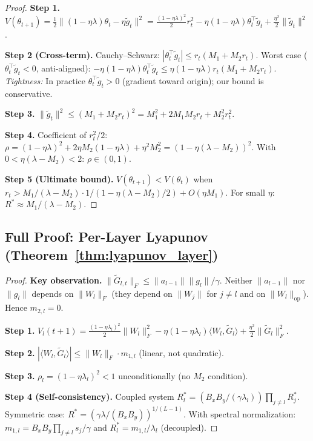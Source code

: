\documentclass{article}
\providecommand{\norm}[1]{\lVert #1 \rVert}
\theoremstyle{plain}
\theoremstyle{definition}
\theoremstyle{remark}
\begin{document}
\begin{proof}
\textbf{Step 1.} $V(\theta_{t+1})=\frac{1}{2}\norm{(1-\eta\lambda)\theta_t-\eta\tilde{g}_t}^2 = \frac{(1-\eta\lambda)^2}{2}r_t^2 - \eta(1-\eta\lambda)\theta_t^\top\tilde{g}_t + \frac{\eta^2}{2}\norm{\tilde{g}_t}^2$.

\textbf{Step 2 (Cross-term).} Cauchy--Schwarz: $|\theta_t^\top\tilde{g}_t|\leq r_t(M_1+M_2 r_t)$. Worst case ($\theta_t^\top\tilde{g}_t<0$, anti-aligned): $-\eta(1-\eta\lambda)\theta_t^\top\tilde{g}_t \leq \eta(1-\eta\lambda)r_t(M_1+M_2 r_t)$. \emph{Tightness:} In practice $\theta_t^\top\tilde{g}_t>0$ (gradient toward origin); our bound is conservative.

\textbf{Step 3.} $\norm{\tilde{g}_t}^2 \leq (M_1+M_2 r_t)^2 = M_1^2 + 2M_1 M_2 r_t + M_2^2 r_t^2$.

\textbf{Step 4.} Coefficient of $r_t^2/2$: $\rho=(1-\eta\lambda)^2+2\eta M_2(1-\eta\lambda)+\eta^2 M_2^2=(1-\eta(\lambda-M_2))^2$. With $0<\eta(\lambda-M_2)<2$: $\rho\in(0,1)$.

\textbf{Step 5 (Ultimate bound).} $V(\theta_{t+1})<V(\theta_t)$ when $r_t > M_1/(\lambda-M_2)\cdot 1/(1-\eta(\lambda-M_2)/2)+O(\eta M_1)$. For small $\eta$: $R^*\approx M_1/(\lambda-M_2)$.
\end{proof}

\subsection{Full Proof: Per-Layer Lyapunov (Theorem~\ref{thm:lyapunov_layer})}

\begin{proof}
\textbf{Key observation.} $\norm{\tilde{G}_{l,t}}_F \leq \norm{a_{l-1}}\norm{g_l}/\gamma$. Neither $\norm{a_{l-1}}$ nor $\norm{g_l}$ depends on $\norm{W_l}_F$ (they depend on $\norm{W_j}$ for $j\neq l$ and on $\norm{W_l}_{\mathrm{op}}$). Hence $m_{2,l}=0$.

\textbf{Step 1.} $V_l(t+1) = \frac{(1-\eta\lambda_l)^2}{2}\norm{W_l}_F^2 - \eta(1-\eta\lambda_l)\langle W_l,\tilde{G}_l\rangle + \frac{\eta^2}{2}\norm{\tilde{G}_l}_F^2$.

\textbf{Step 2.} $|\langle W_l,\tilde{G}_l\rangle| \leq \norm{W_l}_F\cdot m_{1,l}$ (linear, not quadratic).

\textbf{Step 3.} $\rho_l=(1-\eta\lambda_l)^2<1$ unconditionally (no $M_2$ condition).

\textbf{Step 4 (Self-consistency).} Coupled system $R_l^*=(B_xB_y/(\gamma\lambda_l))\prod_{j\neq l}R_j^*$. Symmetric case: $R^*=(\gamma\lambda/(B_xB_y))^{1/(L-1)}$. With spectral normalization: $m_{1,l}=B_xB_y\prod_{j\neq l}s_j/\gamma$ and $R_l^*=m_{1,l}/\lambda_l$ (decoupled).
\end{proof}
\end{document}

